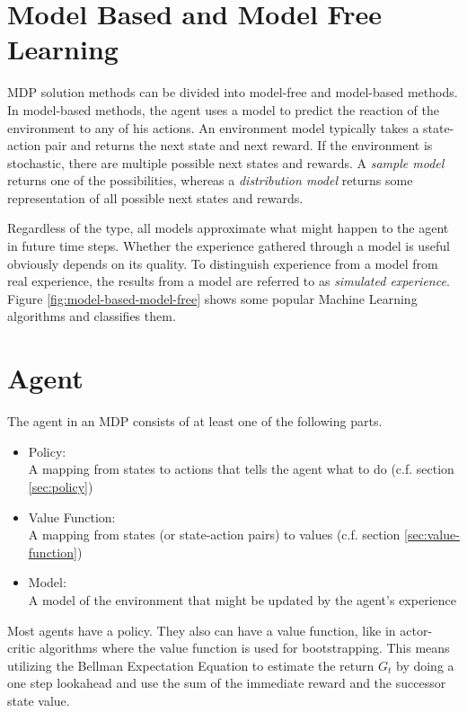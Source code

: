 \section{Model Based and Model Free Learning}

MDP solution methods can be divided into model-free and model-based methods. In model-based methods, the agent uses a model to predict the reaction of the environment to any of his actions. An environment model typically takes a state-action pair and returns the next state and next reward. If the environment is stochastic, there are multiple possible next states and rewards. A \textit{sample model} returns one of the possibilities, whereas a \textit{distribution model} returns some representation of all possible next states and rewards.

Regardless of the type, all models approximate what might happen to the agent in future time steps. Whether the experience gathered through a model is useful obviously depends on its quality. To distinguish experience from a model from real experience, the results from a model are referred to as \textit{simulated experience}\cite{SuttonBarto2018}. Figure \ref{fig:model-based-model-free} shows some popular Machine Learning algorithms and classifies them.

\section{Agent}

The agent in an MDP consists of at least one of the following parts.

\begin{itemize}
	\item Policy: \\
	A mapping from states to actions that tells the agent what to do (c.f. section \ref{sec:policy})
	\item Value Function: \\
	A mapping from states (or state-action pairs) to values (c.f. section \ref{sec:value-function})
	\item Model: \\
	A model of the environment that might be updated by the agent's experience
\end{itemize}

Most agents have a policy. They also can have a value function, like in actor-critic algorithms where the value function is used for bootstrapping. This means utilizing the Bellman Expectation Equation to estimate the return $G_t$ by doing a one step lookahead and use the sum of the immediate reward and the successor state value.

